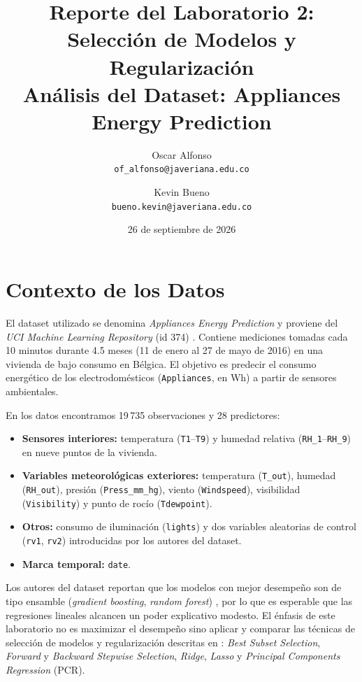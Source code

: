 \documentclass[11pt,a4paper]{article}
\title{Reporte del Laboratorio 2: Selección de Modelos y Regularización\\
\large Análisis del Dataset: Appliances Energy Prediction}
\author{Oscar Alfonso\\\texttt{of\_alfonso@javeriana.edu.co}
  \and Kevin Bueno\\\texttt{bueno.kevin@javeriana.edu.co}}
\date{26 de septiembre de 2026}
\begin{document}
\maketitle

\section{Contexto de los Datos}

El dataset utilizado se denomina \emph{Appliances Energy Prediction} y proviene del
\emph{UCI Machine Learning Repository} (id 374) \cite{candanedo2017}. Contiene mediciones
tomadas cada 10 minutos durante 4.5 meses (11 de enero al 27 de mayo de 2016) en una vivienda
de bajo consumo en Bélgica. El objetivo es predecir el consumo energético de los
electrodomésticos (\texttt{Appliances}, en Wh) a partir de sensores ambientales.

En los datos encontramos 19\,735 observaciones y 28 predictores:

\begin{itemize}
  \item \textbf{Sensores interiores:} temperatura (\texttt{T1}--\texttt{T9}) y humedad relativa
        (\texttt{RH\_1}--\texttt{RH\_9}) en nueve puntos de la vivienda.
  \item \textbf{Variables meteorológicas exteriores:} temperatura (\texttt{T\_out}), humedad
        (\texttt{RH\_out}), presión (\texttt{Press\_mm\_hg}), viento (\texttt{Windspeed}),
        visibilidad (\texttt{Visibility}) y punto de rocío (\texttt{Tdewpoint}).
  \item \textbf{Otros:} consumo de iluminación (\texttt{lights}) y dos variables aleatorias
        de control (\texttt{rv1}, \texttt{rv2}) introducidas por los autores del dataset.
  \item \textbf{Marca temporal:} \texttt{date}.
\end{itemize}

Los autores del dataset reportan que los modelos con mejor desempeño son de tipo ensamble
(\emph{gradient boosting}, \emph{random forest}) \cite{candanedo2017}, por lo que es esperable
que las regresiones lineales alcancen un poder explicativo modesto. El énfasis de este
laboratorio no es maximizar el desempeño sino aplicar y comparar las técnicas de selección de
modelos y regularización descritas en \cite{islr2023}: \emph{Best Subset Selection},
\emph{Forward} y \emph{Backward Stepwise Selection}, \emph{Ridge}, \emph{Lasso} y
\emph{Principal Components Regression} (PCR).
\end{document}
